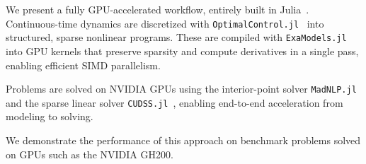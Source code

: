 \documentclass[twoside,leqno,twocolumn]{article}
\begin{document}
We present a fully GPU-accelerated workflow, entirely built in Julia~\cite{bezanson2017julia}.
Continuous-time dynamics are discretized with \texttt{OptimalControl.jl}~\cite{Caillau_OptimalControl_jl_a_Julia} into structured, sparse nonlinear programs.  
These are compiled with \texttt{ExaModels.jl}~\cite{shin2024accelerating} into GPU kernels that preserve sparsity and compute derivatives in a single pass, enabling efficient SIMD parallelism.

Problems are solved on NVIDIA GPUs using the interior-point solver \texttt{MadNLP.jl}~\cite{shin2021graph} and the sparse linear solver \texttt{CUDSS.jl}~\cite{Montoison_CUDSS_jl_Julia_interface}, enabling end-to-end acceleration from modeling to solving.

We demonstrate the performance of this approach on benchmark problems solved on GPUs such as the NVIDIA GH200.


\end{document}
